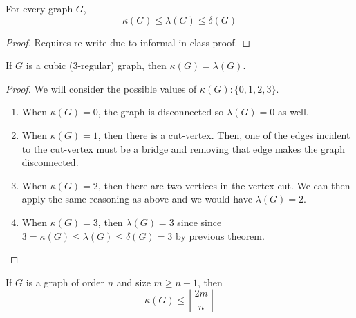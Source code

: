 \begin{theorem}
  For every graph \(G\), 
  \begin{displaymath}
    \kappa(G) \leq \lambda(G) \leq \delta(G)
  \end{displaymath}
\end{theorem}

\begin{proof}


  Requires re-write due to informal in-class proof.
\end{proof}

\begin{theorem}
  If \(G\) is a cubic (3-regular) graph, then \(\kappa(G) =
  \lambda(G)\).
\end{theorem}

\begin{proof}
  We will consider the possible values of \(\kappa(G): \{0, 1, 2,
  3\}\).
  \begin{enumerate}[label=(\alph*.)]
    \item When \(\kappa(G) = 0\), the graph is disconnected so
      \(\lambda(G) = 0\) as well.
    \item When \(\kappa(G) = 1\), then there is a cut-vertex.
      Then, one of the edges incident to the cut-vertex must be a
      bridge and removing that edge makes the graph disconnected.
    \item When \(\kappa(G) = 2\), then there are two vertices in
      the vertex-cut. We can then apply the same reasoning as
      above and we would have \(\lambda(G) = 2\).
    \item When \(\kappa(G) = 3\), then \(\lambda(G) = 3\) since
      since \(3 = \kappa(G) \leq \lambda(G) \leq \delta(G) = 3\)
      by previous theorem.
  \end{enumerate}
\end{proof}

\begin{theorem}
  If \(G\) is a graph of order \(n\) and size \(m \geq n-1\),
  then 
  \begin{displaymath}
    \kappa(G) \leq \left\lfloor\frac{2m}{n}\right\rfloor
  \end{displaymath}
\end{theorem}

